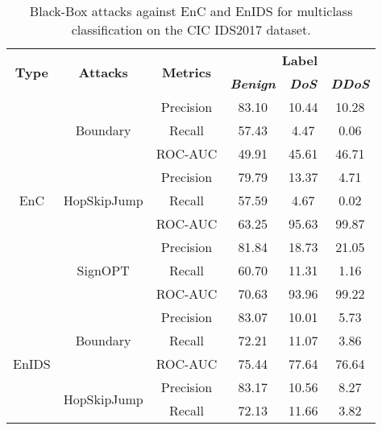 \documentclass[conference]{IEEEtran}
\begin{document}
	\begin{table}[H]
		\caption{Black-Box attacks against EnC and EnIDS for multiclass classification on the CIC IDS2017 dataset.}
		\small
		\setlength{\tabcolsep}{0.1pt}
		\centering
		\label{tab:cic_multi_black}
		\begin{tabular}{|c|c|c|c|c|c|}
			\hline
			\multirow{2}{*}{\textbf{Type}} & \multirow{2}{*}{\textbf{Attacks}} & \multirow{2}{*}{\textbf{Metrics}} & \multicolumn{3}{c|}{\textbf{Label}} \\
			\cline{4-6}
			&  &  & \textbf{\textsl{Benign}} & \textbf{\textsl{DoS}} & \textbf{\textsl{DDoS}}
			\\
			\hline
			\multirow{9}{*}{EnC} & \multirow{3}{*}{Boundary} & Precision & 83.10 & 10.44 & 10.28
			\\
			
			&  & Recall & 57.43 & 4.47 & 0.06
			\\
			
			&  & ROC-AUC & 49.91 & 45.61 & 46.71
			\\
			\cline{2-6}
			& \multirow{3}{*}{HopSkipJump} & Precision & 79.79 & 13.37 & 4.71
			\\
			
			&  & Recall & 57.59 & 4.67 & 0.02
			\\
			
			&  & ROC-AUC & 63.25 & 95.63 & 99.87
			\\
			\cline{2-6}
			& \multirow{3}{*}{SignOPT} & Precision & 81.84 & 18.73 & 21.05
			\\
			
			&  & Recall & 60.70 & 11.31 & 1.16
			\\
			
			&  & ROC-AUC & 70.63 & 93.96 & 99.22
			\\
			\hline
			\multirow{9}{*}{EnIDS} & \multirow{3}{*}{Boundary} & Precision & \cellcolor{yellow!50}83.07 & 10.01 & 5.73
			\\
			
			&  & Recall & \cellcolor{yellow!50}72.21 & 11.07 & 3.86
			\\
			
			&  & ROC-AUC & \cellcolor{yellow!50}75.44 & \cellcolor{yellow!50}77.64 & \cellcolor{yellow!50}76.64
			\\
			\cline{2-6}
			& \multirow{3}{*}{HopSkipJump} & Precision & \cellcolor{yellow!50}83.17 & 10.56 & 8.27
			\\
			
			&  & Recall & \cellcolor{yellow!50}72.13 & 11.66 & 3.82
			\\
			

\end{tabular}
\end{table}
\end{document}
